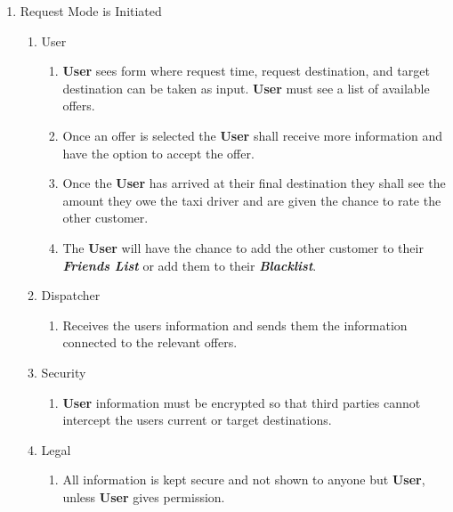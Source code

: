 \documentclass[english]{article}
\begin{document}
\begin{enumerate}[{BE}1.]
	\item Request Mode is Initiated	
	\begin{enumerate}[{VP6}.1]
		\item User
			\begin{enumerate}
				\item \textbf{User} sees form where request time, request destination, and target destination can be taken as input. \textbf{User} must see a list of available offers. 
				\item Once an offer is selected the \textbf{User} shall receive more information and have the option to accept the offer. 
				\item Once the \textbf{User} has arrived at their final destination they shall see the amount they owe the taxi driver and are given the chance to rate the other customer. 
				\item The \textbf{User} will have the chance to add the other customer to their \textbf{\emph{Friends List}} or add them to their \textbf{\emph{Blacklist}}. 
			\end{enumerate}
		\item Dispatcher
			\begin{enumerate}
				\item Receives the users information and sends them the information connected to the relevant offers.
			\end{enumerate}
		\item Security
			\begin{enumerate}
				\item \textbf{User} information must be encrypted so that third parties cannot intercept the users current or target destinations.
			\end{enumerate}
		\item Legal
			\begin{enumerate}
				\item All information is kept secure and not shown to anyone but \textbf{User}, unless \textbf{User} gives permission.
			\end{enumerate}
	\end{enumerate}
	

\end{enumerate}
\end{document}
